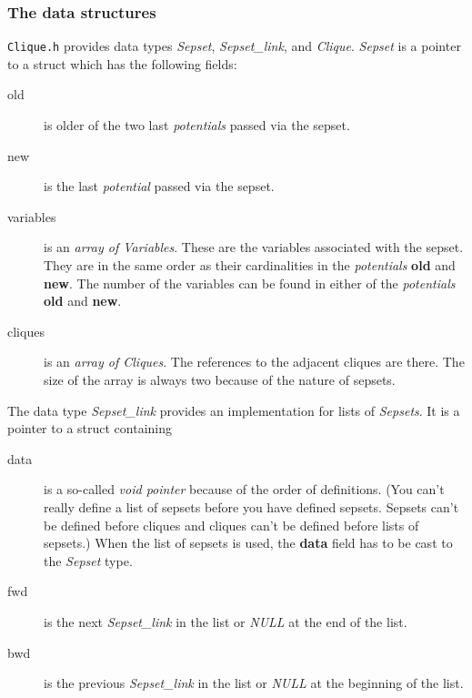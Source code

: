 \documentclass[12pt,a4paper]{report}
\newcommand{\cdatatype}[1]{{\it #1}}
\newcommand{\cfilename}[1]{\texttt{#1}}
\newcommand{\cstructfield}[1]{\textbf{#1}}
\begin{document}
\subsubsection{The data structures}
\cfilename{Clique.h} provides data types \cdatatype{Sepset}, 
\cdatatype{Sepset\_link}, and \cdatatype{Clique}. \cdatatype{Sepset}
is a pointer to a struct which has the following fields:
\begin{description}
\item[old] is older of the two last \cdatatype{potentials} passed via
the sepset.

\item[new] is the last \cdatatype{potential} passed via the sepset.

\item[variables] is an \cdatatype{array of Variables}. These are the 
variables associated with the sepset. They are in the same order as
their cardinalities in the \cdatatype{potentials} \cstructfield{old} and 
\cstructfield{new}. The number of the variables can be found in either 
of the \cdatatype{potentials} \cstructfield{old} and \cstructfield{new}.

\item[cliques] is an \cdatatype{array of Cliques}. The references to the
adjacent cliques are there. The size of the array is always two
because of the nature of sepsets.
\end{description}


The data type \cdatatype{Sepset\_link} provides an implementation for lists
of \cdatatype{Sepsets}. It is a pointer to a struct containing
\begin{description}
\item[data] is a so-called \cdatatype{void pointer} because of the order of
definitions. (You can't really define a list of sepsets before you
have defined sepsets. Sepsets can't be defined before cliques and
cliques can't be defined before lists of sepsets.) When the list of
sepsets is used, the \cstructfield{data} field has to be cast to the 
\cdatatype{Sepset} type. 

\item[fwd] is the next \cdatatype{Sepset\_link} in the list or 
\cdatatype{NULL} at the end of the list.

\item[bwd] is the previous \cdatatype{Sepset\_link} in the list or 
\cdatatype{NULL} at the beginning of the list.

\end{description}
\end{document}
